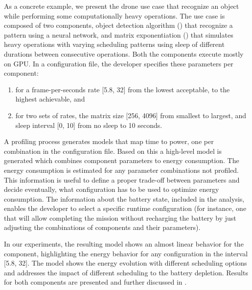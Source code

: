 \label{cross:example}
As a concrete example, we present the drone use case that recognize an object while performing some computationally heavy operations. The use case is composed of two components, object detection algorithm () that recognize a pattern using a neural network, and matrix exponentiation () that simulates heavy operations with varying scheduling patterns using sleep of different durations between consecutive operations. Both the components execute mostly on GPU. In a configuration file, the developer specifies these parameters per component: 
\begin{enumerate}[label={\alph*)},font={\bfseries}]
\item for  a frame-per-seconds rate [5.8, 32] from the lowest acceptable, to the highest achievable, and
\item for  two sets of rates, the matrix size [256, 4096] from smallest to largest, and sleep interval [0, 10] from no sleep to 10 seconds.
\end{enumerate}
A profiling process generates models that map time to power, one per combination in the configuration file. Based on this a high-level model is generated which combines component parameters to energy consumption. The energy consumption is estimated for any parameter combinations not profiled. This information is useful to define a proper trade-off between parameters and decide eventually, what configuration has to be used to optimize energy consumption. The information about the battery state, included in the analysis, enables the developer to select a specific runtime configuration (for instance, one that will allow completing the mission without recharging the battery by just adjusting the combinations of components and their parameters).

In our experiments, the resulting model shows an almost linear behavior for the  component, highlighting the energy behavior for any configuration in the interval [5.8, 32]. The  model shows the energy evolution with different scheduling options and addresses the impact of different scheduling to the battery depletion. Results for both components are presented and further discussed in .


